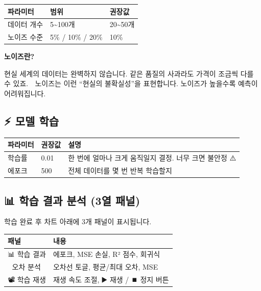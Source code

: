 \documentclass[11pt,a4paper]{article}
\begin{document}
\begin{center}
\begin{tabular}{lll}
\toprule
\textbf{파라미터} & \textbf{범위} & \textbf{권장값} \\
\midrule
데이터 개수 & 5\textasciitilde100개 & 20\textasciitilde50개 \\
노이즈 수준 & 5\% / 10\% / 20\% & 10\% \\
\bottomrule
\end{tabular}
\end{center}

\begin{tipbox}
\textbf{노이즈란?}

현실 세계의 데이터는 완벽하지 않습니다. 같은 품질의 사과라도 가격이 조금씩 다를 수 있죠. 🎲
노이즈는 이런 ``현실의 불확실성''을 표현합니다. 노이즈가 높을수록 예측이 어려워집니다.
\end{tipbox}

\subsection{⚡ 모델 학습}

\begin{center}
\begin{tabular}{llp{6cm}}
\toprule
\textbf{파라미터} & \textbf{권장값} & \textbf{설명} \\
\midrule
학습률 & 0.01 & 한 번에 얼마나 크게 움직일지 결정. 너무 크면 불안정 ⚠️ \\
에포크 & 500 & 전체 데이터를 몇 번 반복 학습할지 🔄 \\
\bottomrule
\end{tabular}
\end{center}

\subsection{📊 학습 결과 분석 (3열 패널)}

학습 완료 후 차트 아래에 3개 패널이 표시됩니다.

\begin{center}
\begin{tabular}{|l|p{8cm}|}
\hline
\rowcolor{bgblue}
\textbf{패널} & \textbf{내용} \\
\hline
📊 학습 결과 & 에포크, MSE 손실, R² 점수, 회귀식 \\
\hline
📏 오차 분석 & 오차선 토글, 평균/최대 오차, MSE \\
\hline
📽️ 학습 재생 & 재생 속도 조절, ▶️ 재생 / ⏹️ 정지 버튼 \\
\hline
\end{tabular}
\end{center}
\end{document}

